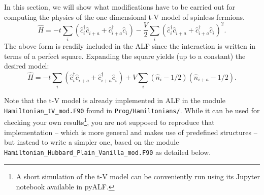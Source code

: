 \documentclass[10pt,modern]{scrartcl}
\numberwithin{exerciseitem}{exercise} %
\begin{document}
In this section, we will show what modifications have to be carried out for computing the physics of the  one dimensional t-V model of spinless fermions.  
\begin{equation}
\hat{H} =  -t \sum_{i} \left( \hat{c}^{\dagger}_{i}  \hat{c}^{\phantom\dagger}_{i+a}      + \hat{c}^{\dagger}_{i+a}  \hat{c}^{\phantom\dagger}_{i} \right) - \frac{V}{2} \sum_{i}  \left( \hat{c}^{\dagger}_{i}  \hat{c}^{\phantom\dagger}_{i+a}      + \hat{c}^{\dagger}_{i+a}  \hat{c}^{\phantom\dagger}_{i} \right)^2 .
\end{equation}
The above form is  readily included in the ALF since  the interaction is written in terms of a perfect square. Expanding the square  yields (up to a constant)  the desired model: 
\begin{equation}
\hat{H} =  -t \sum_{i} \left( \hat{c}^{\dagger}_{i}  \hat{c}^{\phantom\dagger}_{i+a}      + \hat{c}^{\dagger}_{i+a}  \hat{c}^{\phantom\dagger}_{i} \right)  + V  \sum_{i}  \left( \hat{n}_{i} - 1/2 \right)  \left( \hat{n}_{i+a} - 1/2 \right).
\end{equation}

Note that the t-V model is already implemented in ALF in the module \texttt{Hamiltonian\_tV\_mod.F90} found in  \texttt{Prog/Hamiltonians/}. While it can be used for checking your own results\footnote{A short simulation of the t-V model can be conveniently run using its Jupyter notebook available in pyALF.}, you are not supposed to reproduce that implementation -- which is more general and makes use of predefined structures -- but instead to write a simpler one, based on the module \texttt{Hamiltonian\_Hubbard\_Plain\_Vanilla\_mod.F90} as detailed below.


\end{document}
